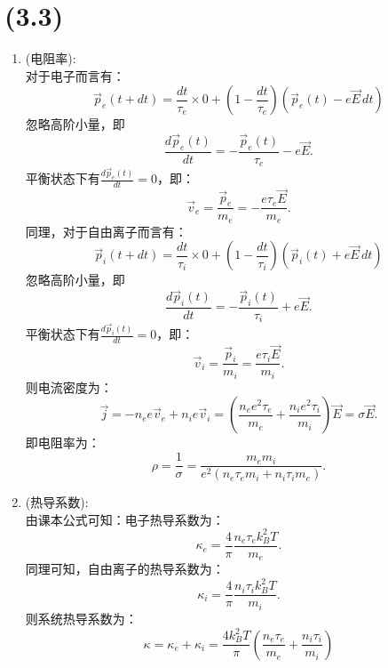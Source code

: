 \documentclass[reqno,a4paper,12pt]{amsart}
\begin{document}
\section{(3.3)}
\begin{enumerate}
	\item (电阻率): \\
	对于电子而言有：
	\[
		\vec{p}_e(t+dt) = \frac{dt}{\tau_e}\times 0 + \left( 1-\frac{dt}{\tau_e} \right) \left( \vec{p}_e(t) - e\vec{E}\,dt \right)
	\]
	忽略高阶小量，即
	\[
		\frac{d\vec{p}_e(t)}{dt} = -\frac{\vec{p}_e(t)}{\tau_e} - e\vec{E}.
	\]
	平衡状态下有$\frac{d \vec{p}_e(t)}{dt} = 0$，即：
	\[
		\vec{v}_e = \frac{\vec{p}_e}{m_e} = -\frac{e\tau_e \vec{E}}{m_e}.
	\]
	同理，对于自由离子而言有：
	\[
		\vec{p}_i(t+dt) = \frac{dt}{\tau_i}\times 0 + \left( 1-\frac{dt}{\tau_i} \right) \left( \vec{p}_i(t) + e\vec{E}\,dt \right)
	\]
	忽略高阶小量，即
	\[
		\frac{d\vec{p}_i(t)}{dt} = -\frac{\vec{p}_i(t)}{\tau_i} + e\vec{E}.
	\]
	平衡状态下有$\frac{d \vec{p}_i(t)}{dt} = 0$，即：
	\[
		\vec{v}_i = \frac{\vec{p}_i}{m_i} = \frac{e\tau_i \vec{E}}{m_i}.
	\]
	则电流密度为：
	\[
		\vec{j} = -n_ee\vec{v}_e + n_ie\vec{v}_i = \left( \frac{n_ee^2\tau_e}{m_e} + \frac{n_ie^2\tau_i}{m_i} \right)\vec{E} = \sigma \vec{E}.
	\]
	即电阻率为：
	\[
		\rho = \frac{1}{\sigma} = \frac{m_em_i}{e^2(n_e\tau_em_i+n_i\tau_im_e)}.
	\]
	
	\item (热导系数): \\
	由课本公式可知：电子热导系数为：
	\[
		\kappa_e = \frac{4}{\pi} \frac{n_e\tau_ek_B^2T}{m_e}.
	\]
	同理可知，自由离子的热导系数为：
	\[
		\kappa_i = \frac{4}{\pi} \frac{n_i\tau_ik_B^2T}{m_i}.
	\]
	则系统热导系数为：
	\[
		\kappa = \kappa_e + \kappa_i = \frac{4k_B^2T}{\pi}\left( \frac{n_e\tau_e}{m_e} + \frac{n_i\tau_i}{m_i} \right)
	\]
	

\end{enumerate}
\end{document}
